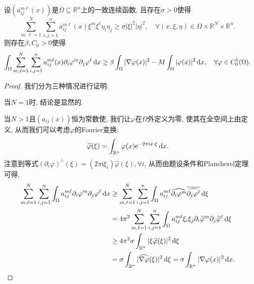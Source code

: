 \begin{lemma}[G\r arding不等式]
    设$(a_{ij}^{m\ell}(x))$是$\overline{\Omega} \subseteq \mathbb{R}^n$上的一致连续函数, 且存在$\sigma > 0$使得 
    \begin{equation*}
        \sum_{m, \ell = 1}^N\sum_{i, j = 1}^na_{ij}^{m\ell}(x)\xi^m\xi^\ell\eta_i\eta_j \geq \sigma|\xi|^2|\eta|^2, \quad \forall (x, \xi, \eta) \in \Omega \times \mathbb{R}^N \times \mathbb{R}^n.
    \end{equation*}
    则存在$\beta, C_0 > 0$使得 
    \begin{equation*}
        \int_{\Omega}\sum_{m, \ell = 1}^N\sum_{i, j = 1}^na_{ij}^{m\ell}(x)\partial_i\varphi^m\partial_j\varphi^\ell \,{\rm d}x \geq \beta\int_{\Omega}|\nabla\varphi(x)|^2 - M\int_{\Omega}|\varphi(x)|^2 \,{\rm d}x, \quad \forall \varphi \in C_0^1(\Omega).
    \end{equation*}
    \begin{proof}
        我们分为三种情况进行证明. 

        当$N = 1$时, 结论是显然的.

        当$N > 1$且$(a_{ij}(x))$恒为常数使, 我们让$\varphi$在$\Omega$外定义为零, 使其在全空间上由定义, 从而我们可以考虑$\varphi$的Fourier变换:
        \begin{equation*}
            \widehat{\varphi}(\xi) = \int_{\mathbb{R}^n}\varphi(x)\mathrm{e}^{-2\pi\mathrm{i}x \cdot \xi} \,{\rm d}x. 
        \end{equation*}
        注意到等式$(\partial_i\varphi)^{\wedge}(\xi) = (2\pi\mathrm{i}\xi_i)\widehat{\varphi}(\xi), \forall i$, 从而由题设条件和Plancherel定理可得, 
        \begin{align*}
            \sum_{m, \ell = 1}^N\sum_{i, j = 1}^n\int_{\Omega}a_{ij}^{m\ell}\partial_i\varphi^m\partial_j\varphi^\ell \,{\rm d}x &\geq \sum_{m, \ell = 1}^N\sum_{i, j = 1}^n\int_{\Omega}a_{ij}^{m\ell}\widehat{\partial_i\varphi^m}\overline{\widehat{\partial_j\varphi^\ell}} \,{\rm d}\xi \\ 
            &= 4\pi^2 \sum_{m, \ell = 1}^N\sum_{i, j = 1}^n\int_{\Omega}a_{ij}^{m\ell}\xi_i\xi_j\partial_i\widehat{\varphi}^m\partial_j\widehat{\varphi}^\ell \,{\rm d}\xi \\ 
            &\geq 4\pi^2\sigma\int_{\mathbb{R}^n}|\xi\widehat{\varphi}(\xi)|^2 \,{\rm d}\xi \\  
            &= \sigma\int_{\mathbb{R}^n}|\widehat{\nabla\varphi}(\xi)|^2 \,{\rm d}\xi = \sigma\int_{\mathbb{R}^n}|\nabla\varphi(x)|^2 \,{\rm d}x. 
        \end{align*}


\end{proof}
\end{lemma}
